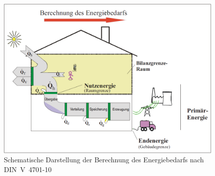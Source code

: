 \begin{figure}[H] \centering
	\centering
		\includegraphics{Pictures/DIN_V_4701_10.png}
	\caption{Schematische Darstellung der Berechnung des Energiebedarfs nach \mbox{DIN V 4701-10} \cite{DeutschesInstitutfurNormunge.V..082003}}
	\label{fig: Abbildung322} 
\end{figure}

